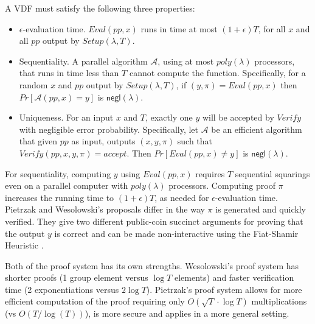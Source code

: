 \documentclass[letterpaper,twocolumn,10pt]{article}
\theoremstyle{definition}
\theoremstyle{remark}
\begin{document}
A VDF must satisfy the following three properties:
\begin{itemize}
\item $\epsilon$-evaluation time. $Eval(pp, x)$ runs in time at most $(1 + \epsilon) T$, for all $x$ and all $pp$ output by $Setup(\lambda, T)$.
\item Sequentiality. A parallel algorithm $\mathcal{A}$, using at most $poly(\lambda)$ processors, that runs in time less than $T$ cannot compute the function. Specifically, for a random $x$ and $pp$ output by $Setup(\lambda, T)$, if $(y, \pi) = Eval(pp, x)$ then $Pr[\mathcal{A}(pp, x) = y]$ is $\mathsf{negl(\lambda)}$.
\item Uniqueness. For an input $x$ and $T$, exactly one $y$ will be accepted by $Verify$ with negligible error probability. Specifically, let $\mathcal{A}$ be an efficient algorithm that given $pp$ as input, outputs $(x, y, \pi)$ such that $Verify(pp, x, y, \pi) = accept$. Then $Pr[Eval(pp, x) \neq y]$ is $\mathsf{negl(\lambda)}$.
\end{itemize}
For sequentiality, computing $y$ using $Eval(pp,x)$ requires $T$ sequential squarings even on a parallel computer with $poly(\lambda)$ processors. Computing proof $\pi$ increases the running time to $(1+\epsilon)T$, as needed for $\epsilon$-evaluation time. Pietrzak \cite{pietrzak2018simple} and Wesolowski's \cite{wesolowski2019efficient} proposals differ in the way $\pi$ is generated and quickly verified. They give two different public-coin succinct arguments for proving that the output $y$ is correct and can be made non-interactive using the Fiat-Shamir Heuristic \cite{amos1986prove}. 

Both of the proof system has its own strengths. Wesolowski's proof system has shorter proofs (1 group element versus $\log T$ elements) and faster verification time (2 exponentiations versus $2 \log T$). Pietrzak's proof system allows for more efficient computation of the proof requiring only $O(\sqrt{T} \cdot \log T)$ multiplications (vs $O(T/\log (T))$), is more secure and applies in a more general setting.
\end{document}
